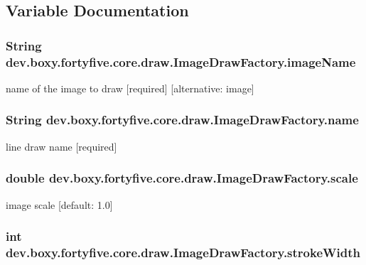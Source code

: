 \subsection{Variable Documentation}
\hypertarget{group___image_draw_gaebbbe2477cdde233cc84bff269d28bee}{
\subsubsection[{imageName}]{\setlength{\rightskip}{0pt plus 5cm}String {\bf dev.boxy.fortyfive.core.draw.ImageDrawFactory.imageName}}}
\label{d8/d0b/group___image_draw_gaebbbe2477cdde233cc84bff269d28bee}
name of the image to draw \mbox{[}required\mbox{]} \mbox{[}alternative: image\mbox{]} \hypertarget{group___image_draw_ga0b4425fc6fc125f08a69acd817b3e928}{
\subsubsection[{name}]{\setlength{\rightskip}{0pt plus 5cm}String {\bf dev.boxy.fortyfive.core.draw.ImageDrawFactory.name}}}
\label{d8/d0b/group___image_draw_ga0b4425fc6fc125f08a69acd817b3e928}
line draw name \mbox{[}required\mbox{]} \hypertarget{group___image_draw_ga49b6468f905e5801eb9fb81931de7a00}{
\subsubsection[{scale}]{\setlength{\rightskip}{0pt plus 5cm}double {\bf dev.boxy.fortyfive.core.draw.ImageDrawFactory.scale}}}
\label{d8/d0b/group___image_draw_ga49b6468f905e5801eb9fb81931de7a00}
image scale \mbox{[}default: 1.0\mbox{]} \hypertarget{group___image_draw_ga55543d51eec3d277bc6141062937ac94}{
\subsubsection[{strokeWidth}]{\setlength{\rightskip}{0pt plus 5cm}int {\bf dev.boxy.fortyfive.core.draw.ImageDrawFactory.strokeWidth}}}
